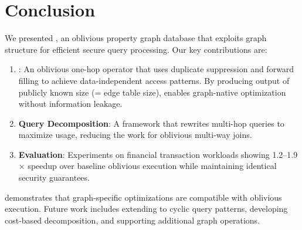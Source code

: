 


\section{Conclusion}
\label{sec:conclusion}

We presented \system, an oblivious property graph database that exploits graph structure for efficient secure query processing. Our key contributions are:

\begin{enumerate}
    \item \textbf{\onehop}: An oblivious one-hop operator that uses duplicate suppression and forward filling to achieve data-independent access patterns. By producing output of publicly known size (= edge table size), \onehop enables graph-native optimization without information leakage.

    \item \textbf{Query Decomposition}: A framework that rewrites multi-hop queries to maximize \onehop usage, reducing the work for oblivious multi-way joins.

    \item \textbf{Evaluation}: Experiments on financial transaction workloads showing 1.2--1.9$\times$ speedup over baseline oblivious execution while maintaining identical security guarantees.
\end{enumerate}

\system demonstrates that graph-specific optimizations are compatible with oblivious execution. Future work includes extending to cyclic query patterns, developing cost-based decomposition, and supporting additional graph operations.

